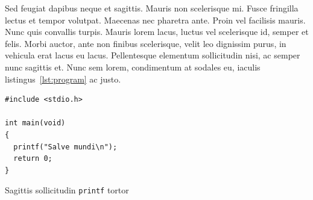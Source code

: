 \documentclass[english,masters]{wizthesis}
\begin{document}
Sed feugiat dapibus neque et sagittis. Mauris non scelerisque mi. Fusce
fringilla lectus et tempor volutpat. Maecenas nec pharetra ante. Proin vel
facilisis mauris. Nunc quis convallis turpis. Mauris lorem lacus, luctus vel
scelerisque id, semper et felis. Morbi auctor, ante non finibus scelerisque,
velit leo dignissim purus, in vehicula erat lacus eu lacus. Pellentesque
elementum sollicitudin nisi, ac semper nunc sagittis et. Nunc sem lorem,
condimentum at sodales eu, iaculis listingus~\ref{lst:program} ac justo.
\begin{listing}[H]
  \begin{verbatim}
#include <stdio.h>

int main(void)
{
  printf("Salve mundi\n");
  return 0;
}
  \end{verbatim}
  \caption{Sagittis sollicitudin \texttt{printf} tortor}
  \label{lst:program}
\end{listing}
\end{document}
